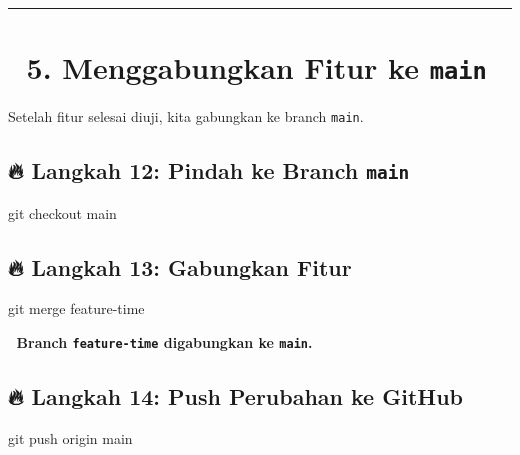 \documentclass[
  letterpaper,
  DIV=11,
  numbers=noendperiod]{scrreprt}
\newenvironment{Shaded}{\begin{snugshade}}{\end{snugshade}}
\newcommand{\FunctionTok}[1]{\textcolor[rgb]{0.28,0.35,0.67}{#1}}
\newcommand{\NormalTok}[1]{\textcolor[rgb]{0.00,0.23,0.31}{#1}}
\begin{document}
\begin{center}\rule{0.5\linewidth}{0.5pt}\end{center}

\section{\texorpdfstring{🔹 \textbf{5. Menggabungkan Fitur ke
\texttt{main}}}{🔹 5. Menggabungkan Fitur ke main}}\label{menggabungkan-fitur-ke-main}

Setelah fitur selesai diuji, kita gabungkan ke branch \texttt{main}.

\subsection{\texorpdfstring{🔥 \textbf{Langkah 12: Pindah ke Branch
\texttt{main}}}{🔥 Langkah 12: Pindah ke Branch main}}\label{langkah-12-pindah-ke-branch-main}

\begin{Shaded}
\begin{Highlighting}[]
\FunctionTok{git}\NormalTok{ checkout main}
\end{Highlighting}
\end{Shaded}

\subsection{\texorpdfstring{🔥 \textbf{Langkah 13: Gabungkan
Fitur}}{🔥 Langkah 13: Gabungkan Fitur}}\label{langkah-13-gabungkan-fitur}

\begin{Shaded}
\begin{Highlighting}[]
\FunctionTok{git}\NormalTok{ merge feature{-}time}
\end{Highlighting}
\end{Shaded}

📌 \textbf{Branch \texttt{feature-time} digabungkan ke \texttt{main}.}

\subsection{\texorpdfstring{🔥 \textbf{Langkah 14: Push Perubahan ke
GitHub}}{🔥 Langkah 14: Push Perubahan ke GitHub}}\label{langkah-14-push-perubahan-ke-github}

\begin{Shaded}
\begin{Highlighting}[]
\FunctionTok{git}\NormalTok{ push origin main}
\end{Highlighting}
\end{Shaded}
\end{document}
